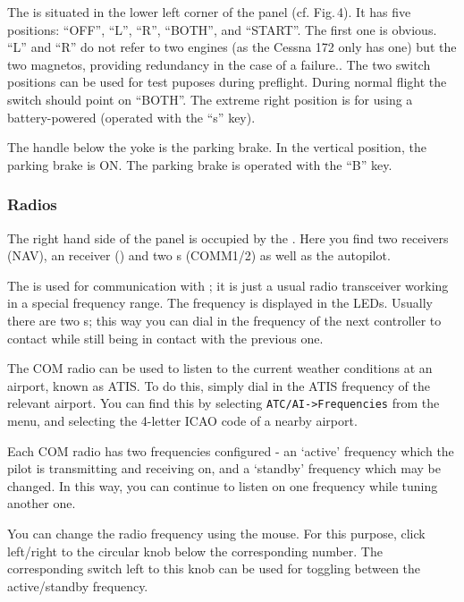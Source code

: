 \begin{itemize}
The  is situated in the lower left corner of the
panel (cf. Fig.\,4). It has five positions: ``OFF'', ``L'', ``R'',
``BOTH'', and ``START''. The first one is obvious. ``L'' and ``R'' do
not refer to two engines (as the Cessna 172 only has one) but the
two magnetos, providing redundancy in the case of a failure.. The two switch
positions can be used for test puposes during preflight. During normal
flight the switch should point on ``BOTH''. The extreme right position
is for  using a battery-powered
 (operated with the ``s'' key).

The handle below the yoke is the parking brake. In the vertical position,
the parking brake is ON. The parking brake is operated with the ``B'' key.

\subsubsection{Radios}

The right hand side of the panel is occupied by the . Here
you find two  receivers (NAV), an  receiver
() and two s (COMM1/2)
 as well as the autopilot.

The  is used for communication with ; it is just a usual radio transceiver working in a special
frequency range. The frequency is displayed in the LEDs. Usually
there are two s; this way you can dial in the frequency
of the next controller to contact while still being in contact with the previous
one.

The COM radio can be used to listen to the current weather conditions at an
airport, known as ATIS. To do this, simply dial in the ATIS frequency of the
relevant airport. You can find this by selecting \texttt{ATC/AI->Frequencies}
from the menu, and selecting the 4-letter ICAO code of a nearby airport.

Each COM radio has two frequencies configured - an `active' frequency which
the pilot is transmitting and receiving on, and a `standby' frequency which may
be changed. In this way, you can continue to listen on one frequency while tuning
another one.

You can change the radio frequency using the mouse. For this
purpose, click left/right to the circular knob below the corresponding
number. The corresponding switch left to this knob can be used for
toggling between the active/standby frequency.


\end{itemize}
